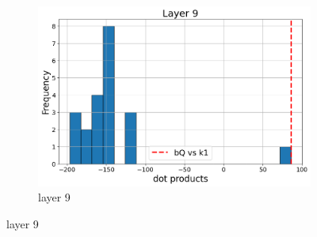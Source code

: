 \documentclass[11pt]{article}
\begin{document}
\begin{figure}[t]
\begin{subfigure}[t]{0.24\textwidth}
    \includegraphics[width=1.4\columnwidth]{figures/obs1_appendix/obs1_layer9.png}
    \caption{layer 9}
  \end{subfigure}\hfill
    \vspace{2mm}
    

\end{figure}
\end{document}
